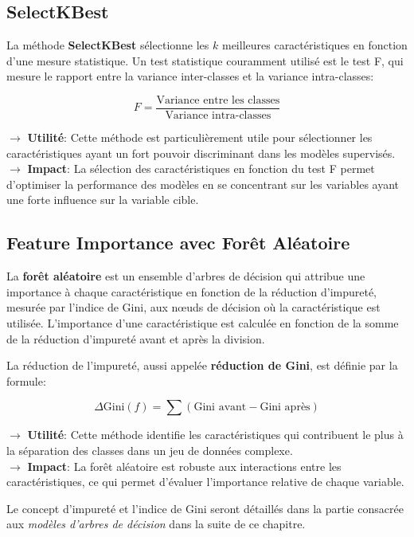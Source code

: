 \subsection{SelectKBest}

La méthode \textbf{SelectKBest} sélectionne les $k$ meilleures caractéristiques en fonction d'une mesure statistique. Un test statistique couramment utilisé est le test F, qui mesure le rapport entre la variance inter-classes et la variance intra-classes:

\[
F = \frac{\text{Variance entre les classes}}{\text{Variance intra-classes}}
\]

\noindent \textbf{\(\rightarrow\)} \textbf{Utilité}: Cette méthode est particulièrement utile pour sélectionner les caractéristiques ayant un fort pouvoir discriminant dans les modèles supervisés.\\
\textbf{\(\rightarrow\)} \textbf{Impact}: La sélection des caractéristiques en fonction du test F permet d'optimiser la performance des modèles en se concentrant sur les variables ayant une forte influence sur la variable cible.

\subsection{Feature Importance avec Forêt Aléatoire}

La \textbf{forêt aléatoire} est un ensemble d'arbres de décision qui attribue une importance à chaque caractéristique en fonction de la réduction d'impureté, mesurée par l'indice de Gini, aux nœuds de décision où la caractéristique est utilisée. L'importance d'une caractéristique est calculée en fonction de la somme de la réduction d'impureté avant et après la division.

La réduction de l'impureté, aussi appelée \textbf{réduction de Gini}, est définie par la formule:

\[
\Delta \text{Gini}(f) = \sum (\text{Gini avant} - \text{Gini après})
\]

\noindent \textbf{\(\rightarrow\)} \textbf{Utilité}: Cette méthode identifie les caractéristiques qui contribuent le plus à la séparation des classes dans un jeu de données complexe.\\
\textbf{\(\rightarrow\)} \textbf{Impact}: La forêt aléatoire est robuste aux interactions entre les caractéristiques, ce qui permet d'évaluer l'importance relative de chaque variable.

Le concept d'impureté et l'indice de Gini seront détaillés dans la partie consacrée aux \textit{modèles d'arbres de décision} dans la suite de ce chapitre.

